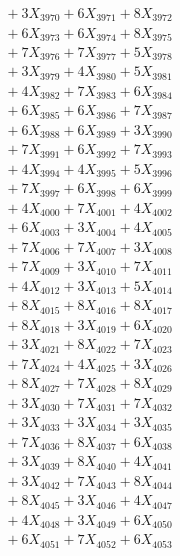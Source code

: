 \documentclass[a4paper,10pt]{article}
\begin{document}
{\begin{align}
&\;  + 3 X_{3970} + 6 X_{3971} + 8 X_{3972} \\[0.3ex]
&\;  + 6 X_{3973} + 6 X_{3974} + 8 X_{3975} \\[0.3ex]
&\;  + 7 X_{3976} + 7 X_{3977} + 5 X_{3978} \\[0.3ex]
&\;  + 3 X_{3979} + 4 X_{3980} + 5 X_{3981} \\[0.3ex]
&\;  + 4 X_{3982} + 7 X_{3983} + 6 X_{3984} \\[0.3ex]
&\;  + 6 X_{3985} + 6 X_{3986} + 7 X_{3987} \\[0.3ex]
&\;  + 6 X_{3988} + 6 X_{3989} + 3 X_{3990} \\[0.3ex]
&\;  + 7 X_{3991} + 6 X_{3992} + 7 X_{3993} \\[0.3ex]
&\;  + 4 X_{3994} + 4 X_{3995} + 5 X_{3996} \\[0.3ex]
&\;  + 7 X_{3997} + 6 X_{3998} + 6 X_{3999} \\[0.5ex]\allowbreak
&\;  + 4 X_{4000} + 7 X_{4001} + 4 X_{4002} \\[0.3ex]
&\;  + 6 X_{4003} + 3 X_{4004} + 4 X_{4005} \\[0.3ex]
&\;  + 7 X_{4006} + 7 X_{4007} + 3 X_{4008} \\[0.3ex]
&\;  + 7 X_{4009} + 3 X_{4010} + 7 X_{4011} \\[0.3ex]
&\;  + 4 X_{4012} + 3 X_{4013} + 5 X_{4014} \\[0.3ex]
&\;  + 8 X_{4015} + 8 X_{4016} + 8 X_{4017} \\[0.3ex]
&\;  + 8 X_{4018} + 3 X_{4019} + 6 X_{4020} \\[0.3ex]
&\;  + 3 X_{4021} + 8 X_{4022} + 7 X_{4023} \\[0.3ex]
&\;  + 7 X_{4024} + 4 X_{4025} + 3 X_{4026} \\[0.3ex]
&\;  + 8 X_{4027} + 7 X_{4028} + 8 X_{4029} \\[0.5ex]\allowbreak
&\;  + 3 X_{4030} + 7 X_{4031} + 7 X_{4032} \\[0.3ex]
&\;  + 3 X_{4033} + 3 X_{4034} + 3 X_{4035} \\[0.3ex]
&\;  + 7 X_{4036} + 8 X_{4037} + 6 X_{4038} \\[0.3ex]
&\;  + 3 X_{4039} + 8 X_{4040} + 4 X_{4041} \\[0.3ex]
&\;  + 3 X_{4042} + 7 X_{4043} + 8 X_{4044} \\[0.3ex]
&\;  + 8 X_{4045} + 3 X_{4046} + 4 X_{4047} \\[0.3ex]
&\;  + 4 X_{4048} + 3 X_{4049} + 6 X_{4050} \\[0.3ex]
&\;  + 6 X_{4051} + 7 X_{4052} + 6 X_{4053} \\[0.3ex]

\end{align}}
\end{document}
